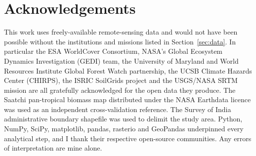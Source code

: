 \documentclass[12pt,a4paper]{article}
\begin{document}
\section{Acknowledgements}

This work uses freely-available remote-sensing data and would not have
been possible without the institutions and missions listed in
Section~\ref{sec:data}. In particular the ESA WorldCover Consortium,
NASA's Global Ecosystem Dynamics Investigation (GEDI) team, the
University of Maryland and World Resources Institute Global Forest
Watch partnership, the UCSB Climate Hazards Center (CHIRPS), the
ISRIC SoilGrids project and the USGS/NASA SRTM mission are all
gratefully acknowledged for the open data they produce. The Saatchi
pan-tropical biomass map distributed under the NASA Earthdata licence
was used as an independent cross-validation reference. The Survey of
India administrative boundary shapefile was used to delimit the study
area. Python, NumPy, SciPy, matplotlib, pandas, rasterio and
GeoPandas underpinned every analytical step, and I thank their
respective open-source communities. Any errors of interpretation are
mine alone.

\end{document}
